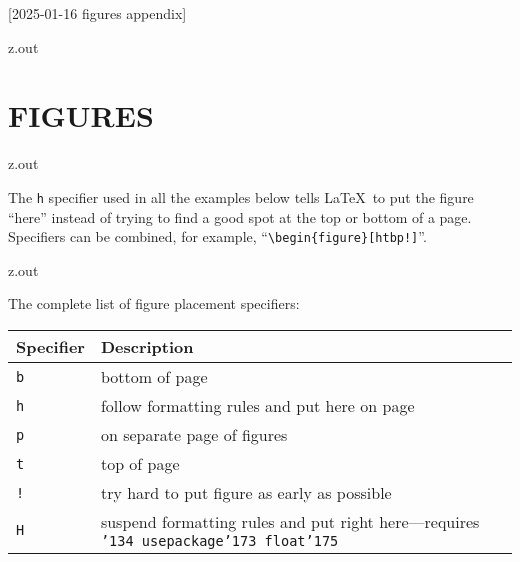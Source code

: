 [2025-01-16 figures appendix]

\begin{VerbatimOut}{z.out}
\chapter{FIGURES}
\end{VerbatimOut}

\MyIO


\begin{VerbatimOut}{z.out}

The
\verb+h+
specifier used in all the examples below
tells \LaTeX\ to put the figure
``here''
instead of trying
to find a good spot
at the top or bottom of a page.
Specifiers can be combined,
for example,
``\verb+\begin{figure}[htbp!]+''.
\end{VerbatimOut}

\MyIO


\begin{VerbatimOut}{z.out}

The complete list of figure placement specifiers:
\vspace*{6pt}
\begin{center}
  \begin{tabular}{@{}ll@{}}
    \toprule
    \bf Specifier& \bf Description\\
    \midrule
    \noalign{\vspace*{2pt}}
    \tt b& bottom of page\\
    \tt h& follow formatting rules and put here on page\\
    \tt p& on separate page of figures\\
    \tt t& top of page\\
    \tt !& try hard to put figure as early as possible\\
    \tt H& suspend formatting rules and put right here---requires \tt\char'134 usepackage\char'173 float\char'175\\
    \bottomrule
  \end{tabular}
\end{center}
\index{\verb+\begin{tabular}+}
\end{VerbatimOut}

\MyIO



